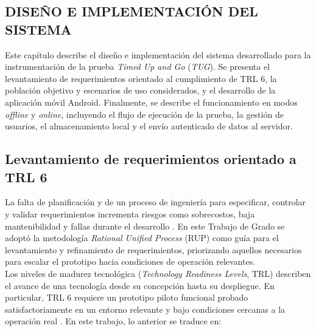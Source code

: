 \documentclass[12pt]{report}
\begin{document}
\begin{justify}



    \chapter{DISEÑO E IMPLEMENTACIÓN DEL SISTEMA}
    \label{ch:diseno-implementacion}

    Este capítulo describe el diseño e implementación del sistema desarrollado para la instrumentación de la prueba \textit{Timed Up and Go} (\textit{TUG}). Se presenta el levantamiento de requerimientos orientado al cumplimiento de TRL 6, la población objetivo y escenarios de uso considerados, y el desarrollo de la aplicación móvil Android. Finalmente, se describe el funcionamiento en modos \textit{offline} y \textit{online}, incluyendo el flujo de ejecución de la prueba, la gestión de usuarios, el almacenamiento local y el envío autenticado de datos al servidor.

    \section{Levantamiento de requerimientos orientado a TRL 6}
    \label{sec:req-trl6}

    La falta de planificación y de un proceso de ingeniería para especificar, controlar y validar requerimientos incrementa riesgos como sobrecostos, baja mantenibilidad y fallas durante el desarrollo \cite{desarrollo-RUP}. En este Trabajo de Grado se adoptó la metodología \textit{Rational Unified Process} (RUP) como guía para el levantamiento y refinamiento de requerimientos, priorizando aquellos necesarios para escalar el prototipo hacia condiciones de operación relevantes.\\

    Los niveles de madurez tecnológica (\textit{Technology Readiness Levels}, TRL) describen el avance de una tecnología desde su concepción hasta su despliegue. En particular, TRL 6 requiere un prototipo piloto funcional probado satisfactoriamente en un entorno relevante y bajo condiciones cercanas a la operación real \cite{TRL-EuroFunding}. En este trabajo, lo anterior se traduce en:


\end{justify}
\end{document}
